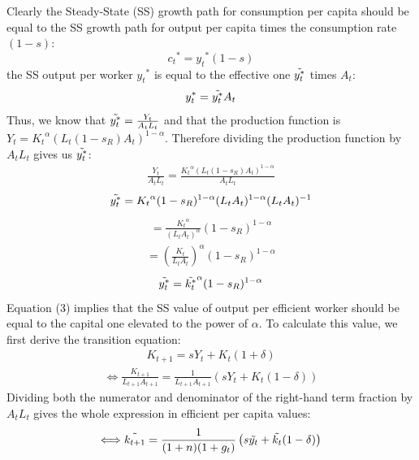 \documentclass[11pt]{article} %
\begin{document}
Clearly the Steady-State (SS) growth path for consumption per capita should be equal to the SS growth path for output per capita times the consumption rate $(1-s)$:
\begin{equation}
    {c_t}^*={y_t}^{*}(1-s)
\end{equation}
the SS output per worker ${y_t}^*$ is equal to the effective one $\Tilde{y_t^*}$ times $A_t$:
\begin{equation}
    y_t^*=\Tilde{y_t^*}A_t
\end{equation}
Thus, we know that $\Tilde{y_t^*}=\frac{Y_t}{{A_t}{L_t}}$ and that the production function is $Y_t={K_t}^{\alpha}\left({L_t}(1-{s_R}){A_t}\right)^{1-\alpha}$. Therefore dividing the production function by $A_tL_t$ gives us $\Tilde{y_t^*}$:
\begin{align*}
    \frac{Y_t}{A_tL_t}=\frac{{K_t}^{\alpha}\left(L_t(1-{s_R})A_t\right)^{1-\alpha}}{A_tL_t}
\end{align*}
\begin{align*}
    \Tilde{y_t^*}={K_t}^{\alpha}(1-s_R)^{1-\alpha}(L_tA_t)^{1-\alpha}(L_tA_t)^{-1}
\end{align*}
\begin{align*}
    =\frac{{K_t}^\alpha}{(L_tA_t)^{\alpha}}(1-{s_R})^{1-\alpha}
\end{align*}
\begin{align*}
    =\left(\frac{{K_t}}{L_tA_t}\right)^{\alpha}(1-{s_R})^{1-\alpha}
\end{align*}
\begin{equation}
    \Tilde{y_t^*}=\Tilde{k_t^*}^{\alpha}(1-{s_R})^{1-\alpha}
\end{equation}
Equation (3) implies that the SS value of output per efficient worker should be equal to the capital one elevated to the power of $\alpha$. To calculate this value, we first derive the transition equation:
\begin{align*}
    K_{t+1}=sY_t+K_t(1+\delta)    
\end{align*}
\begin{align*}
    \Longleftrightarrow\frac{K_{t+1}}{{L_{t+1}}{A_{t+1}}}=\frac{1}{{{L_{t+1}}{A_{t+1}}}}\left(sY_t+K_t(1-\delta)\right)
\end{align*}
Dividing both the numerator and denominator of the right-hand term fraction by $A_tL_t$ gives the whole expression in efficient per capita values:
\begin{align*}
    \Longleftrightarrow\Tilde{k_{t+1}}=\frac{1}{(1+n)(1+g_t)}\left(s\Tilde{y_t}+\Tilde{k_t}(1-\delta)\right)
\end{align*}
\end{document}
